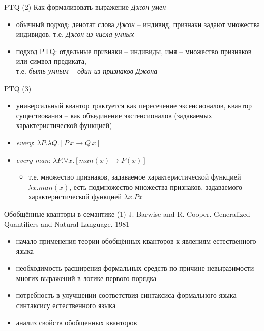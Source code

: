 \documentclass{beamer}
\begin{document}
\begin{frame}{PTQ (2)}
Как формализовать выражение \textit{Джон умен}
\bigskip
\begin{itemize}
   	\item обычный подход: денотат слова \textit{Джон} -- индивид, признаки задают множества индивидов, т.е. \textit{Джон из числа умных}
   	\medskip
   	\item подход PTQ: отдельные признаки -- индивиды, имя -- множество признаков или символ предиката,\\ т.е. \textit{быть умным -- один из признаков Джона}
\end{itemize}
\end{frame}

\begin{frame}{PTQ (3)}
\begin{itemize}
	\item универсальный квантор трактуется как пересечение эксенсионалов, квантор существования -- как объединение экстенсионалов (задаваемых характеристической функцией)
	\medskip
    \item \textit{every}: $\lambda P . \lambda Q . [ P\,x \to Q\,x ]$
    \medskip
    \item \textit{every man}: $\lambda P . \forall x . [ man(x) \to P(x) ]$ 
        \medskip
        \begin{itemize}
            \item[] т.е. множество признаков, задаваемое характеристической функцией $\lambda x . man(x)$, есть подмножество множества признаков, задаваемого характеристической функцией $\lambda x . Px$
        \end{itemize}
\end{itemize}
\end{frame}

\begin{frame}{Обобщённые кванторы в семантике (1)}
J. Barwise and R. Cooper. Generalized Quantifiers and Natural Language. 1981
\bigskip
\begin{itemize}
	\item начало применения теории обобщённых кванторов к явлениям естественного языка
	\item необходимость расширения формальных средств по причине невыразимости многих выражений в логике первого порядка
	\item потребность в улучшении соответствия синтаксиса формального языка синтаксису естественного языка
	\item анализ свойств обобщенных кванторов
\end{itemize}
\end{frame}
\end{document}
